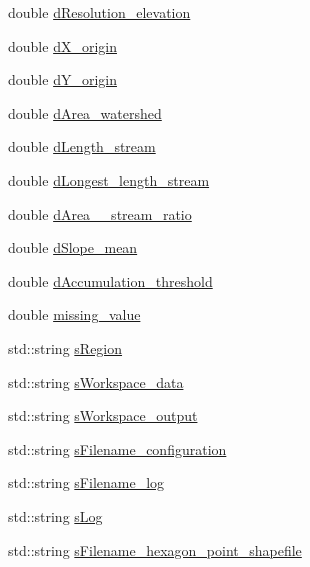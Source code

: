 \begin{DoxyCompactItemize}
\item 
double \hyperlink{classhexwatershed_1_1domain_a22b6e1b39cd846bfc82d1c3fe86e0886}{d\-Resolution\-\_\-elevation}
\item 
double \hyperlink{classhexwatershed_1_1domain_a39b4717af33e4821536463e885329151}{d\-X\-\_\-origin}
\item 
double \hyperlink{classhexwatershed_1_1domain_acc93bafe88763e95e9919f7b57f2c4b1}{d\-Y\-\_\-origin}
\item 
double \hyperlink{classhexwatershed_1_1domain_a9e795c0653f95505ef7644911000ad67}{d\-Area\-\_\-watershed}
\item 
double \hyperlink{classhexwatershed_1_1domain_a2c358b846c8211809a2ff82708b57fcd}{d\-Length\-\_\-stream}
\item 
double \hyperlink{classhexwatershed_1_1domain_a422214efada705de83d13d0fa77218ec}{d\-Longest\-\_\-length\-\_\-stream}
\item 
double \hyperlink{classhexwatershed_1_1domain_a87acb765b1435ff5f6cb08a5af07d834}{d\-Area\-\_\-\_\-stream\-\_\-ratio}
\item 
double \hyperlink{classhexwatershed_1_1domain_a5fa8787a45b52c82c86b15adc945c46d}{d\-Slope\-\_\-mean}
\item 
double \hyperlink{classhexwatershed_1_1domain_ab3b0972033f100aa1080c709c4bc1ee1}{d\-Accumulation\-\_\-threshold}
\item 
double \hyperlink{classhexwatershed_1_1domain_a07e80b92d1c62b66af5e94c7a139981f}{missing\-\_\-value}
\item 
std\-::string \hyperlink{classhexwatershed_1_1domain_a86902641b63b77dccfef08a94df2e55b}{s\-Region}
\item 
std\-::string \hyperlink{classhexwatershed_1_1domain_a61879b2d1218be6af1b35d936b00fcf2}{s\-Workspace\-\_\-data}
\item 
std\-::string \hyperlink{classhexwatershed_1_1domain_a613b370ecaa3cb488c84a05b20d87cf2}{s\-Workspace\-\_\-output}
\item 
std\-::string \hyperlink{classhexwatershed_1_1domain_a237356c07d7d19526bc78884cc8e7dc1}{s\-Filename\-\_\-configuration}
\item 
std\-::string \hyperlink{classhexwatershed_1_1domain_a807070dbc27d9f921316937879419aa5}{s\-Filename\-\_\-log}
\item 
std\-::string \hyperlink{classhexwatershed_1_1domain_aee8643251832efafa47400b95dc504d1}{s\-Log}
\item 
std\-::string \hyperlink{classhexwatershed_1_1domain_addabb6266ed831687398d7e99c7a1eb6}{s\-Filename\-\_\-hexagon\-\_\-point\-\_\-shapefile}

\end{DoxyCompactItemize}
